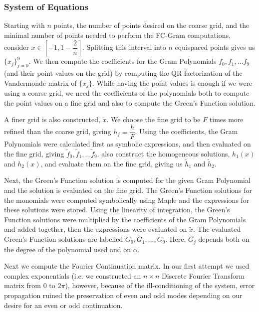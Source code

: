 \documentclass[11pt]{amsart}
\begin{document}
\subsubsection{System of Equations}

Starting with $n$ points, the number of points desired on the coarse grid, and the minimal number of points needed to perform the FC-Gram computations, consider $x \in [-1, 1-\dfrac{2}{n}]$.  Splitting this interval into $n$ equispaced points gives us $\{x_j\}_{j=0}^9$.  We then compute the coefficients for the Gram Polynomials $f_0,f_1,\ldots f_9$(and their point values on the grid) by computing the QR factorization of the Vandermonde matrix of $\{x_j\}$.  While having the point values is enough if we were using a coarse grid, we need the coefficients of the polynomials both to compute the point values on a fine grid and also to compute the Green's Function solution.  


A finer grid is also constructed, $\tilde{x}$.  We choose the fine grid to be $F$ times more refined than the coarse grid, giving $h_f=\dfrac{h}{F}$.  Using the coefficients, the Gram Polynomials were calculated first as symbolic expressions, and then evaluated on the fine grid, giving  $\tilde{f}_0,\tilde{f}_1,\ldots \tilde{f}_9 $.  also construct the homogeneous solutions, $h_1(x)$ and $h_2(x)$, and evaluate them on the fine grid, giving us $\tilde{h}_1$ and $\tilde{h}_2$.  

Next, the Green's Function solution is computed for the given Gram Polynomial and the solution is evaluated on the fine grid. The Green's Function solutions for the monomials were computed symbolically using Maple and the expressions for these solutions were stored.  Using the linearity of integration, the Green's Function solutions were multiplied by the coefficients of the Gram Polynomials and added together,  then  the expressions were evaluated on $\tilde{x}$.  The evaluated Green's Function solutions are labelled  $\tilde{G}_0,\tilde{G}_1,\ldots,\tilde{G}_9$.  Here, $\tilde{G}_j$ depends both on the degree of the polynomial used and on $\alpha$. 

Next we compute the Fourier Continuation matrix.  In our first attempt we used complex exponentials (i.e. we constructed an $n \times n$ Discrete Fourier Transform matrix from $0$ to $2\pi$), however, because of the ill-conditioning of the system, error propagation ruined the preservation of even and odd modes depending on our desire for an even or odd continuation.  
\end{document}
